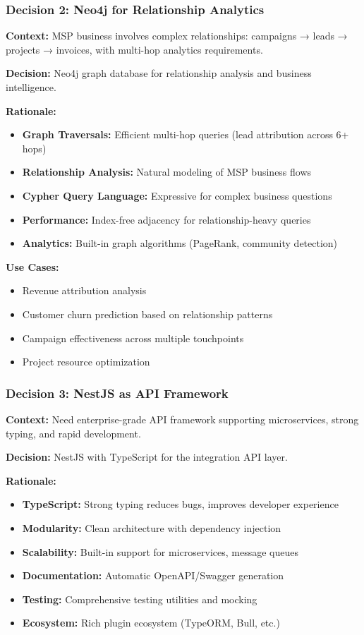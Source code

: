 \subsubsection{Decision 2: Neo4j for Relationship Analytics}

\textbf{Context:} MSP business involves complex relationships: campaigns → leads → projects → invoices, with multi-hop analytics requirements.

\textbf{Decision:} Neo4j graph database for relationship analysis and business intelligence.

\textbf{Rationale:}
\begin{itemize}
  \item \textbf{Graph Traversals:} Efficient multi-hop queries (lead attribution across 6+ hops)
  \item \textbf{Relationship Analysis:} Natural modeling of MSP business flows
  \item \textbf{Cypher Query Language:} Expressive for complex business questions
  \item \textbf{Performance:} Index-free adjacency for relationship-heavy queries
  \item \textbf{Analytics:} Built-in graph algorithms (PageRank, community detection)
\end{itemize}

\textbf{Use Cases:}
\begin{itemize}
  \item Revenue attribution analysis
  \item Customer churn prediction based on relationship patterns
  \item Campaign effectiveness across multiple touchpoints
  \item Project resource optimization
\end{itemize}

\subsubsection{Decision 3: NestJS as API Framework}

\textbf{Context:} Need enterprise-grade API framework supporting microservices, strong typing, and rapid development.

\textbf{Decision:} NestJS with TypeScript for the integration API layer.

\textbf{Rationale:}
\begin{itemize}
  \item \textbf{TypeScript:} Strong typing reduces bugs, improves developer experience
  \item \textbf{Modularity:} Clean architecture with dependency injection
  \item \textbf{Scalability:} Built-in support for microservices, message queues
  \item \textbf{Documentation:} Automatic OpenAPI/Swagger generation
  \item \textbf{Testing:} Comprehensive testing utilities and mocking
  \item \textbf{Ecosystem:} Rich plugin ecosystem (TypeORM, Bull, etc.)
\end{itemize}

